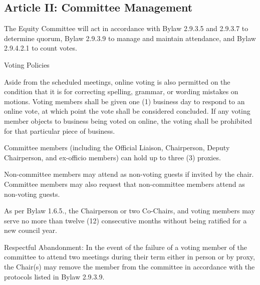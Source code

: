 \subsection{Article II: Committee Management}
\begin{longenum}[ label*=\thesubsection.\arabic*., align=left] 
\item The Equity Committee will act in accordance with Bylaw 2.9.3.5 and 2.9.3.7 to determine quorum, Bylaw 2.9.3.9 to manage and maintain attendance, and Bylaw 2.9.4.2.1 to count votes.
\item Voting Policies
	\begin{longenum}[ label*=\arabic*., align=left] 
	\item Aside from the scheduled meetings, online voting is also permitted on the condition that it is for correcting spelling, grammar, or wording mistakes on motions. Voting members shall be given one (1) business day to respond to an online vote, at which point the vote shall be considered concluded. If any voting member objects to business being voted on online, the voting shall be prohibited for that particular piece of business.
	\item Committee members (including the Official Liaison, Chairperson, Deputy Chairperson, and ex-officio members) can hold up to three (3) proxies.
	\end{longenum}
\item Non-committee members may attend as non-voting guests if invited by the chair. Committee members may also request that non-committee members attend as non-voting guests.
\item As per Bylaw 1.6.5., the Chairperson or two Co-Chairs, and voting members may serve no more than twelve (12) consecutive months without being ratified for a new council year.
\item Respectful Abandonment: In the event of the failure of a voting member of the committee to attend two meetings during their term either in person or by proxy, the Chair(s) may remove the member from the committee in accordance with the protocols listed in Bylaw 2.9.3.9.
\end{longenum}

